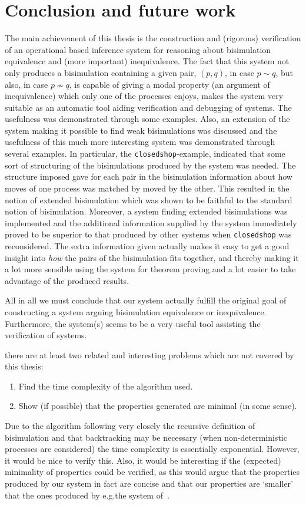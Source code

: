 
\chapter{Conclusion and future work}\label{chapConclusion}

The main achievement of this thesis is the construction and (rigorous) verification of an operational based inference system for reasoning about bisimulation equivalence and (more important) inequivalence. The fact that this system not only produces a bisimulation containing a given pair, $(p,q)$, in case $p\sim q$, but also, in case $p\not\sim q$, is capable of giving a modal property (an argument of inequivalence) which only one of the processes enjoys, makes the system very suitable as an automatic tool aiding verification and debugging of systems. The usefulness was demonstrated through some examples. Also, an extension of the system making it possible to find weak bisimulations was discussed and the usefulness of this much more interesting system was demonstrated through several examples. In particular, the \verb#closedshop#-example, indicated that some sort of structuring of the bisimulations produced by the system was needed. The structure imposed gave for each pair in the bisimulation information about how moves of one process was matched by moved by the other. This resulted in the notion of extended bisimulation which was shown to be faithful to the standard notion of bisimulation. Moreover, a system finding extended bisimulations was implemented and the additional information supplied by the system immediately proved to be superior to that produced by other systems when \verb#closedshop# was reconsidered. The extra information given actually makes it easy to get a good insight into {\em how\/} the pairs of the bisimulation fits together, and thereby making it a lot more sensible using the system for theorem proving and a lot easier to take advantage of the produced results.

All in all we must conclude that our system actually fulfill the original goal of constructing a system arguing bisimulation equivalence or inequivalence. Furthermore, the system(s) seems to be a very useful tool assisting the verification of systems.

there are at least two related and interesting problems which are not covered by this thesis:
\begin{enumerate}
\item Find the time complexity of the algorithm used.
\item Show (if possible) that the properties generated are minimal (in some sense).
\end{enumerate}
Due to the algorithm following very closely the recursive definition of bisimulation and that backtracking may be necessary (when non-deterministic processes are considered) the time complexity is essentially exponential. However, it would be nice to verify this. Also, it would be interesting if the (expected) minimality of properties could be verified, as this would argue that the properties produced by our system in fact are concise and that our properties are `smaller' that the ones produced by e.g.\@ the system of~\cite{VestmarOlesen}.

